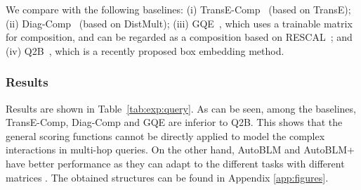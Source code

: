 \documentclass[10pt,journal,compsoc]{IEEEtran}
\begin{document}
We compare with the following baselines:
(i) TransE-Comp~\cite{guu2015traversing}
(based on
TransE); (ii)
Diag-Comp~\cite{guu2015traversing}
(based on DistMult); 
(iii) GQE~\cite{hamilton2018embedding}, which
uses a 
 trainable 
matrix  
for composition,
and can be regarded as a composition based on RESCAL~\cite{nickel2011three}; and
(iv)
Q2B~\cite{ren2019query2box},
which is a recently proposed box embedding method.


\subsubsection{Results}

Results are
shown in Table~\ref{tab:exp:query}.
As can be seen, among the baselines,
TransE-Comp, Diag-Comp and GQE are inferior
to Q2B.
This shows that the general scoring functions
cannot be directly applied to model the complex interactions
in multi-hop queries.
On the other hand,
AutoBLM and
AutoBLM+ have better performance as
they can adapt to the different tasks with different matrices .
The obtained structures can be found in Appendix \ref{app:figures}.
\end{document}

